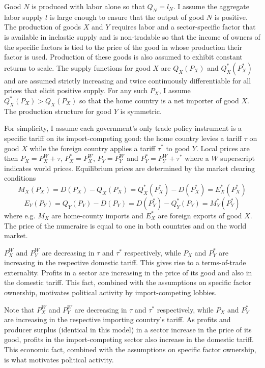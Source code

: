 \documentclass[12pt]{article}
\begin{document}
Good $N$ is produced with labor alone so that $Q_N = l_N$. I assume the aggregate labor supply $l$ is large enough to ensure that the output of good $N$ is positive. The production of goods $X$ and $Y$ requires labor and a sector-specific factor that is available in inelastic supply and is non-tradable so that the income of owners of the specific factors is tied to the price of the good in whose production their factor is used. Production of these goods is also assumed to exhibit constant returns to scale. The supply functions for good $X$ are $Q_X(P_X)$ and $Q_X^*(P_X^*)$ and are assumed strictly increasing and twice continuously differentiable for all prices that elicit positive supply. For any such $P_X$, I assume $Q_X^*(P_X) > Q_X(P_X)$ so that the home country is a net importer of good $X$. The production structure for good $Y$ is symmetric. 

For simplicity, I assume each government's only trade policy instrument is a specific tariff on its import-competing good: the home country levies a tariff $\tau$ on good $X$ while the foreign country applies a tariff $\tau^*$ to good $Y$. Local prices are then $P_X = P_X^W + \tau$, $P_X^* = P_X^W$, $P_Y = P_Y^W$ and $P_Y^* = P_Y^W + \tau^*$ where a $W$ superscript indicates world prices. Equilibrium prices are determined by the market clearing conditions
$$M_X(P_X)= D(P_X)-Q_X(P_X) = Q_X^*(P_X^*) - D(P_X^*) = E_X^*(P_X^*)$$
$$E_Y(P_Y)=Q_Y(P_Y)-D(P_Y) = D(P_Y^*)-Q_Y^*(P_Y) = M_Y^*(P_Y^*)$$
where e.g. $M_X$ are home-county imports and $E_X^*$ are foreign exports of good $X$. The price of the numeraire is equal to one in both countries and on the world market.

$P_X^W$ and $P_Y^W$ are decreasing in $\tau$ and $\tau^*$ respectively, while $P_X$ and $P_Y^*$ are increasing in the respective domestic tariff. This gives rise to a terms-of-trade externality. Profits in a sector are increasing in the price of its good and also in the domestic tariff. This fact, combined with the assumptions on specific factor ownership, motivates political activity by import-competing lobbies.

Note that $P_X^W$ and $P_Y^W$ are decreasing in $\tau$ and $\tau^*$ respectively, while $P_X$ and $P_Y^*$ are increasing in the respective importing country's tariff. As profits and producer surplus (identical in this model) in a sector increase in the price of its good, profits in the import-competing sector also increase in the domestic tariff. This economic fact, combined with the assumptions on specific factor ownership, is what motivates political activity.
\end{document}
